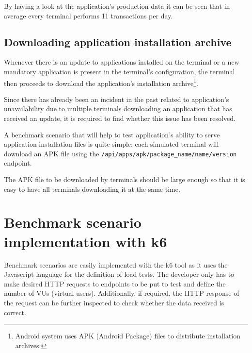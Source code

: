 \documentclass[12pt, a4paper]{article}
\let\oldsection\section
\renewcommand\section{\clearpage\oldsection}
\begin{document}
By having a look at the application's production data it can be seen that in average every terminal performs 11 transactions per day.

\subsection{Downloading application installation archive}

Whenever there is an update to applications installed on the terminal or a new mandatory application is present in the terminal's configuration, the terminal then proceeds to download the application's installation archive\footnote{Android system uses APK (Android Package) files to distribute installation archives.}.

Since there has already been an incident in the past related to application's unavailability due to multiple terminals downloading an application that has received an update, it is required to find whether this issue has been resolved. 

A benchmark scenario that will help to test application's ability to serve application installation files is quite simple: each simulated terminal will download an APK file using the \texttt{/api/apps/apk/{package\_name}/{name}/{version}} endpoint.

The APK file to be downloaded by terminals should be large enough so that it is easy to have all terminals downloading it at the same time.

\section{Benchmark scenario implementation with k6}

Benchmark scenarios are easily implemented with the k6 tool as it uses the Javascript language for the definition of load tests.
The developer only has to make desired HTTP requests to endpoints to be put to test and define the number of VUs (virtual users).
Additionally, if required, the HTTP response of the request can be further inspected to check whether the data received is correct.
\end{document}
